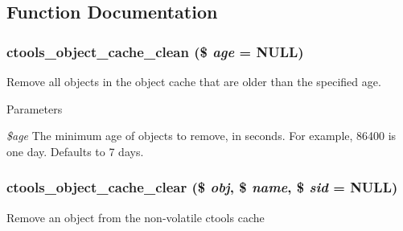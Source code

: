 \subsection{Function Documentation}
\hypertarget{object-cache_8inc_a56a7767ed65dd1dc91cdfaffc989155d}{
\subsubsection[{ctools\_\-object\_\-cache\_\-clean}]{\setlength{\rightskip}{0pt plus 5cm}ctools\_\-object\_\-cache\_\-clean (\$ {\em age} = {\ttfamily NULL})}}
\label{object-cache_8inc_a56a7767ed65dd1dc91cdfaffc989155d}
Remove all objects in the object cache that are older than the specified age.


\begin{DoxyParams}{Parameters}
\item[{\em \$age}]The minimum age of objects to remove, in seconds. For example, 86400 is one day. Defaults to 7 days. \end{DoxyParams}
\hypertarget{object-cache_8inc_a1320649cf3e7337f7c1874f5b9a14cca}{
\subsubsection[{ctools\_\-object\_\-cache\_\-clear}]{\setlength{\rightskip}{0pt plus 5cm}ctools\_\-object\_\-cache\_\-clear (\$ {\em obj}, \/  \$ {\em name}, \/  \$ {\em sid} = {\ttfamily NULL})}}
\label{object-cache_8inc_a1320649cf3e7337f7c1874f5b9a14cca}
Remove an object from the non-\/volatile ctools cache


